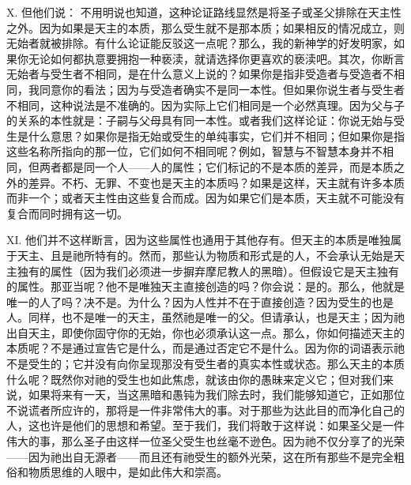 X. 但他们说： 不用明说也知道，这种论证路线显然是将圣子或圣父排除在天主性之外。因为如果是天主的本质，那么受生就不是那本质；如果相反的情况成立，则无始者就被排除。有什么论证能反驳这一点呢？那么，我的新神学的好发明家，如果你无论如何都执意要拥抱一种亵渎，就请选择你更喜欢的亵渎吧。其次，你断言无始者与受生者不相同，是在什么意义上说的？如果你是指非受造者与受造者不相同，我同意你的看法；因为与受造者确实不是同一本性。但如果你说生者与受生者不相同，这种说法是不准确的。因为实际上它们相同是一个必然真理。因为父与子的关系的本性就是：子嗣与父母具有同一本性。或者我们这样论证：你说无始与受生是什么意思？如果你是指无始或受生的单纯事实，它们并不相同；但如果你是指这些名称所指向的那一位，它们如何不相同呢？例如，智慧与不智慧本身并不相同，但两者都是同一个人——人的属性；它们标记的不是本质的差异，而是本质之外的差异。不朽、无罪、不变也是天主的本质吗？如果是这样，天主就有许多本质而非一个；或者天主性由这些复合而成。因为如果它们是本质，天主就不可能没有复合而同时拥有这一切。\par

XI. 他们并不这样断言，因为这些属性也通用于其他存有。但天主的本质是唯独属于天主、且是祂所特有的。然而，那些认为物质和形式是的人，不会承认无始是天主独有的属性（因为我们必须进一步摒弃摩尼教人的黑暗）。但假设它是天主独有的属性。那亚当呢？他不是唯独天主直接创造的吗？你会说：是的。那么，他就是唯一的人了吗？决不是。为什么？因为人性并不在于直接创造？因为受生的也是人。同样，也不是唯一的天主，虽然祂是唯一的父。但请承认，也是天主；因为祂出自天主，即使你固守你的无始，你也必须承认这一点。那么，你如何描述天主的本质呢？不是通过宣告它是什么，而是通过否定它不是什么。因为你的词语表示祂不是受生的；它并没有向你呈现那没有受生者的真实本性或状态。那么天主的本质什么呢？既然你对祂的受生也如此焦虑，就该由你的愚昧来定义它；但对我们来说，如果将来有一天，当这黑暗和愚钝为我们除去时，我们能够知道它，正如那位不说谎者所应许的，那将是一件非常伟大的事。对于那些为达此目的而净化自己的人，这也许是他们的思想和希望。至于我们，我们将敢于这样说：如果圣父是一件伟大的事，那么圣子由这样一位圣父受生也丝毫不逊色。因为祂不仅分享了的光荣——因为祂出自无源者——而且还有祂受生的额外光荣，这在所有那些不是完全粗俗和物质思维的人眼中，是如此伟大和崇高。\par

